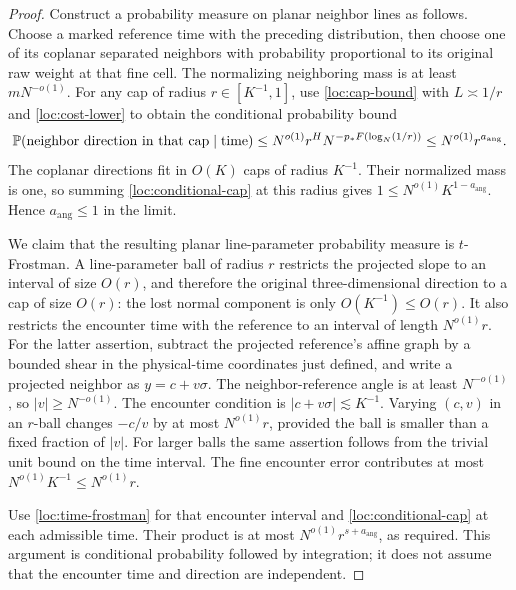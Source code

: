 \begin{proof}
Construct a probability measure on planar neighbor lines as follows.
Choose a marked reference time with the preceding distribution,
then choose one of its coplanar separated neighbors with probability
proportional to its original raw weight at that fine cell.  The
normalizing neighboring mass is at least $mN^{-o(1)}$.
For any cap of radius $r\in[K^{-1},1]$, use
\eqref{loc:cap-bound} with $L\asymp1/r$ and
\eqref{loc:cost-lower} to obtain the conditional probability bound
\begin{equation}
 \mathbb P(\text{neighbor direction in that cap}\mid\text{time})
 \leq N^{o(1)}r^H
       N^{-p_*F(\log_N(1/r))}
 \leq N^{o(1)}r^{a_{\mathrm{ang}}}.
 \label{loc:conditional-cap}
\end{equation}
The coplanar directions fit in $O(K)$ caps of radius $K^{-1}$.
Their normalized mass is one, so summing
\eqref{loc:conditional-cap} at this radius gives
$1\leq N^{o(1)}K^{1-a_{\mathrm{ang}}}$.  Hence
$a_{\mathrm{ang}}\leq1$ in the limit.

We claim that the resulting planar line-parameter probability measure
is $t$-Frostman.  A line-parameter ball of radius $r$ restricts the
projected slope to an interval of size $O(r)$, and therefore the
original three-dimensional direction to a cap of size $O(r)$:
the lost normal component is only $O(K^{-1})\leq O(r)$.  It also
restricts the encounter time with the reference to an interval of
length $N^{o(1)}r$.  For the latter assertion, subtract the
projected reference's affine graph by a bounded shear in the
physical-time coordinates just defined, and write a projected
neighbor as $y=c+v\sigma$.  The neighbor-reference angle
is at least $N^{-o(1)}$, so $|v|\geq N^{-o(1)}$.  The encounter
condition is $|c+v\sigma|\lesssim K^{-1}$.  Varying $(c,v)$ in an
$r$-ball changes $-c/v$ by at most $N^{o(1)}r$, provided the ball
is smaller than a fixed fraction of $|v|$.  For larger balls the
same assertion follows from the trivial unit bound on the time
interval.  The fine encounter error contributes at most
$N^{o(1)}K^{-1}\leq N^{o(1)}r$.

Use \eqref{loc:time-frostman} for that encounter interval and
\eqref{loc:conditional-cap} at each admissible time.  Their product
is at most $N^{o(1)}r^{s+a_{\mathrm{ang}}}$, as required.  This
argument is conditional probability followed by integration; it
does not assume that the encounter time and direction are independent.


\end{proof}
